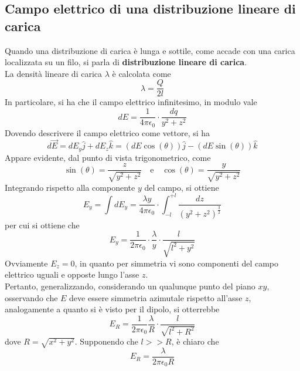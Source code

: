\documentclass[a4paper]{extarticle}
\begin{document}
\vspace{1em}
\noindent
\subsection{Campo elettrico di una distribuzione lineare di carica}
Quando una distribuzione di carica è lunga e sottile, come accade con una carica localizzata su un filo, si parla di \textbf{distribuzione lineare di carica}.\\
La densità lineare di carica $\lambda$ è calcolata come
\[\lambda = \frac{Q}{2 l}\]
In particolare, si ha che il campo elettrico infinitesimo, in modulo vale
\[d E = \frac{1}{4 \pi \epsilon_0} \cdot \frac{dq}{y^2 + z^2}\]
Dovendo descrivere il campo elettrico come vettore, si ha
\[d \vec{E} = dE_y \hat{j} + d E_z \hat{k} = (d E \cos(\theta)) \hat{j} - (d E \sin(\theta)) \hat{k}\]
Appare evidente, dal punto di vista trigonometrico, come
\[\sin(\theta) = \frac{z}{\sqrt{y^2 + z^2}} \hspace{1em} \text{e} \hspace{1em} \cos(\theta) = \frac{y}{\sqrt{y^2 + z^2}}\]
Integrando rispetto alla componente $y$ del campo, si ottiene
\[E_y = \int d E_y = \frac{\lambda y}{4 \pi \epsilon_0} \cdot \int_{-l}^{+l} \frac{dz}{(y^2 + z^2)^{\frac{3}{2}}}\]
per cui si ottiene che
\[E_y = \frac{1}{2 \pi \epsilon_0} \cdot \frac{\lambda}{y} \cdot \frac{l}{\sqrt{l^2 + y^2}}\]
Ovviamente $E_z = 0$, in quanto per simmetria vi sono componenti del campo elettrico uguali e opposte lungo l'asse $z$.\\ 
Pertanto, generalizzando, considerando un qualunque punto del piano $xy$, osservando che $E$ deve essere simmetria azimutale rispetto all'asse $z$, analogamente a quanto si è visto per il dipolo, si otterrebbe
\[\boxed{E_R = \frac{1}{2 \pi \epsilon_0} \frac{\lambda}{R} \cdot \frac{l}{\sqrt{l^2+R^2}}}\]
dove $R=\sqrt{x^2+y^2}$.
Supponendo che $l >> R$, è chiaro che
\[\boxed{E_R = \frac{\lambda}{2 \pi \epsilon_0 R}}\]

\vspace{1em}
\end{document}
